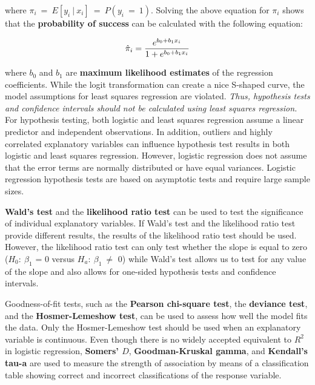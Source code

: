 \documentclass[
]{report}
\begin{document}
where \(\scriptstyle \pi_i \ = \ E[y_i \  | \  x_i] \ = \ P(y_i \ = \ 1)\). Solving the above equation for \(\scriptstyle \pi_i\) shows that the \textbf{probability of success} can be calculated with the following equation:

\begin{equation}
\hat{\pi}_i = \frac{e^{b_0 + b_1 x_i}}{1 + e^{b_0 + b_1 x_i}}
\notag
\end{equation}

where \(\scriptstyle b_0\) and \(\scriptstyle b_1\) are \textbf{maximum likelihood estimates} of the regression coefficients. While the logit transformation can create a nice S-shaped curve, the model assumptions for least squares regression are violated. \textit{Thus, hypothesis tests and confidence intervals should not be calculated using least squares regression.} For hypothesis testing, both logistic and least squares regression assume a linear predictor and independent observations. In addition, outliers and highly correlated explanatory variables can influence hypothesis test results in both logistic and least squares regression. However, logistic regression does not assume that the error terms are normally distributed or have equal variances. Logistic regression hypothesis tests are based on asymptotic tests and require large sample sizes.

\textbf{Wald's test} and the \textbf{likelihood ratio test} can be used to test the significance of individual explanatory variables. If Wald's test and the likelihood ratio test provide different results, the results of the likelihood ratio test should be used. However, the likelihood ratio test can only test whether the slope is equal to zero (\(\scriptstyle H_0: \ \beta_1\) = 0 versus \(\scriptstyle H_a: \  \beta_1 \  \neq\) 0) while Wald's test allows us to test for any value of the slope and also allows for one-sided hypothesis tests and confidence intervals.

Goodness-of-fit tests, such as the \textbf{Pearson chi-square test}, the \textbf{deviance test}, and the \textbf{Hosmer-Lemeshow test}, can be used to assess how well the model fits the data. Only the Hosmer-Lemeshow test should be used when an explanatory variable is continuous. Even though there is no widely accepted equivalent to \(\scriptstyle R^2\) in logistic regression, \textbf{Somers' \(\scriptstyle D\)}, \textbf{Goodman-Kruskal gamma}, and \textbf{Kendall's tau-a} are used to measure the strength of association by means of a classification table showing correct and incorrect classifications of the response variable.
\end{document}
